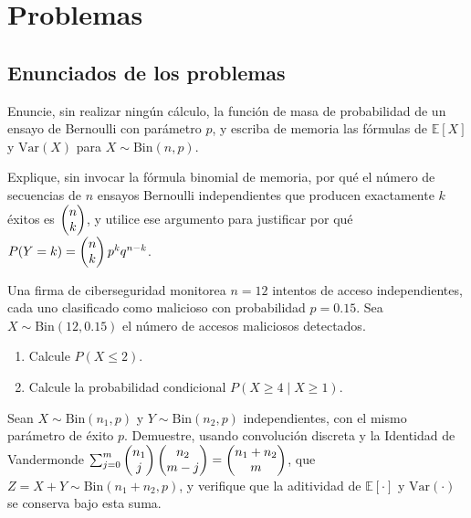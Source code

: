 \section*{Problemas}

\subsection*{Enunciados de los problemas}

\begin{problema}
	\label{prob:71ce5a0}
	Enuncie, sin realizar ningún cálculo, la función de masa de probabilidad de un ensayo de Bernoulli con parámetro $p$, y escriba de memoria las fórmulas de $\mathbb{E}[X]$ y $\text{Var}(X)$ para $X \sim \text{Bin}(n,p)$.
\end{problema}

\begin{problema}
	\label{prob:1149be6}
	Explique, sin invocar la fórmula binomial de memoria, por qué el número de secuencias de $n$ ensayos Bernoulli independientes que producen exactamente $k$ éxitos es $\begin{pmatrix} n \\ k\end{pmatrix}$, y utilice ese argumento para justificar por qué $P(Y=k) = \begin{pmatrix} n \\ k\end{pmatrix}p^k q^{n-k}$.
\end{problema}

\begin{problema}
	\label{prob:c3d2032}
	Una firma de ciberseguridad monitorea $n=12$ intentos de acceso independientes, cada uno clasificado como malicioso con probabilidad $p=0.15$. Sea $X \sim \text{Bin}(12, 0.15)$ el número de accesos maliciosos detectados.
	\begin{enumerate}
		\item Calcule $P(X \le 2)$.
		\item Calcule la probabilidad condicional $P(X \ge 4 \mid X \ge 1)$.
	\end{enumerate}
\end{problema}

\begin{problema}
	\label{prob:bae56b2}
	Sean $X \sim \text{Bin}(n_1,p)$ y $Y \sim \text{Bin}(n_2,p)$ independientes, con el mismo parámetro de éxito $p$. Demuestre, usando convolución discreta y la Identidad de Vandermonde $\sum_{j=0}^m \begin{pmatrix} n_1 \\ j\end{pmatrix}\begin{pmatrix} n_2 \\ m-j\end{pmatrix}=\begin{pmatrix} n_1+n_2 \\ m\end{pmatrix}$, que $Z=X+Y \sim \text{Bin}(n_1+n_2,p)$, y verifique que la aditividad de $\mathbb{E}[\cdot]$ y $\text{Var}(\cdot)$ se conserva bajo esta suma.
\end{problema}

